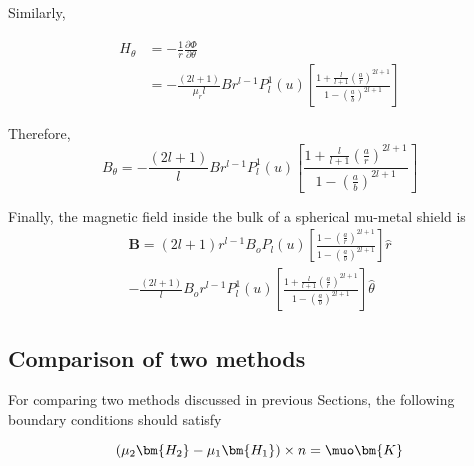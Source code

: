 Similarly,

\begin{equation}\label{Ht}
\begin{split}
 H_\theta &=-\frac{1}{r}\frac{\partial \Phi}{\partial \theta}\\
         & =-\frac{(2l+1)}{\mu_rl}Br^{l-1}P_l^1(u)\left[
         \frac{1+\frac{l}{l+1}\left(\frac{a}{r}\right)^{2l+1}}
         {1-\left(\frac{a}{b}\right)^{2l+1}}
         \right]
\end{split}
\end{equation}

Therefore,
\begin{equation}\label{Bt}
B_\theta=-\frac{(2l+1)}{l}Br^{l-1}P_l^1(u)\left[\frac{1+\frac{l}{l+1}\left(\frac{a}{r}\right)^{2l+1}}{1-\left(\frac{a}{b}\right)^{2l+1}}\right]
\end{equation}

Finally, the magnetic field inside the bulk of a spherical mu-metal shield is
\begin{multline}\label{B}
\bm{B}=(2l+1)r^{l-1}B_o P_l(u)\left[\frac{1-\left(\frac{a}{r}\right)^{2l+1}}{1-\left(\frac{a}{b}\right)^{2l+1}}\right] \hat{r} \\ -\frac{(2l+1)}{l}B_o r^{l-1}P_l^1(u)\left[\frac{1+\frac{l}{l+1}\left(\frac{a}{r}\right)^{2l+1}}{1-\left(\frac{a}{b}\right)^{2l+1}}\right] \hat{\theta}
\end{multline}


\subsection{Comparison of two methods}
For comparing two methods discussed in previous Sections, the following boundary conditions should satisfy

\begin{equation}\label{b3}   
(\mu_2\bm{H_2} - \mu_1\bm{H_1})\times n = \muo \bm{K}  
\end{equation}

